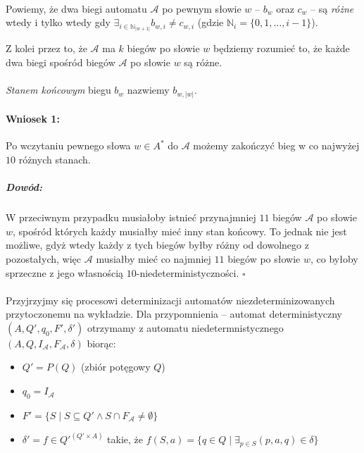 \documentclass[12pt]{article}
\newcommand*{\Autom}{\mathcal{A}}
\newcommand*{\QEDB}{\hfill\ensuremath{\square}}%
\begin{document}
\paragraph{}
Powiemy, że dwa biegi automatu $\Autom$ po pewnym słowie $w$ – {$b_w$ oraz $c_w$} – są
\textit{różne} wtedy i tylko wtedy gdy $\exists_{i \in \mathbb{N}_{|w + 1|}} b_{w,i} \neq c_{w,i}$
(gdzie $\mathbb{N}_{i} = \{0, 1, \dots, i - 1\}$). 

Z kolei przez to, że $\Autom$ ma $k$ biegów po słowie $w$ będziemy rozumieć to, że każde dwa biegi
spośród biegów $\Autom$ po słowie $w$ są różne.

\paragraph{}
\textit{Stanem końcowym} biegu $b_w$ nazwiemy $b_{w,|w|}$.


\paragraph{Wniosek 1:}
Po wczytaniu pewnego słowa $w \in A^*$ do $\Autom$ możemy zakończyć bieg w co najwyżej
$10$ różnych stanach.
\subparagraph{Dowód:}
W przeciwnym przypadku musiałoby istnieć przynajmniej $11$ biegów $\Autom$ po 
słowie $w$, spośród których każdy musiałby mieć inny stan końcowy. To jednak nie jest możliwe, 
gdyż wtedy każdy z tych biegów byłby różny od dowolnego z pozostałych, więc $\Autom$ musiałby mieć
co najmniej $11$ biegów po słowie $w$, co byłoby sprzeczne z jego własnością
$10$-niedeterministyczności. \QEDB

\paragraph{}
Przyjrzyjmy się procesowi determinizacji automatów niezdeterminizowanych przytoczonemu na
wykładzie. Dla przypomnienia – automat deterministyczny $(A, Q', q_0, F', \delta')$ otrzymamy
z automatu niedetermnistycznego $(A, Q, I_\Autom, F_\Autom, \delta)$ biorąc:
\begin{itemize}
  \item $Q' = P(Q)$ (zbiór potęgowy $Q$)
  \item $q_0 = I_\Autom$
  \item $F' = \{S \mid S \subseteq Q' \land S \cap F_\Autom \neq \emptyset\}$
  \item $\delta' = f \in Q'^{(Q'\times A)}$ takie, że
	$f(S, a) = \{q \in Q \mid \exists_{p \in S} (p, a, q) \in \delta\}$
\end{itemize}
\end{document}
